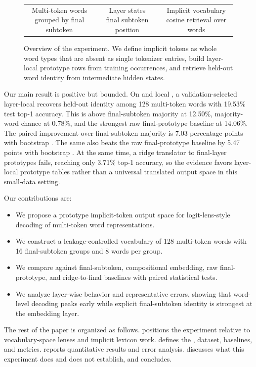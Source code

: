 \begin{figure}[t]
    \centering
    \setlength{\tabcolsep}{4pt}
    \begin{tabular}{@{}c@{\quad$\rightarrow$\quad}c@{\quad$\rightarrow$\quad}c@{}}
        \fbox{\parbox{0.25\linewidth}{\centering Multi-token words\\{\small grouped by final subtoken}}} &
        \fbox{\parbox{0.25\linewidth}{\centering Layer states\\{\small final subtoken position}}} &
        \fbox{\parbox{0.25\linewidth}{\centering Implicit vocabulary\\{\small cosine retrieval over words}}}
    \end{tabular}
    \caption{Overview of the \itl experiment. We define implicit tokens as whole word types that are absent as single tokenizer entries, build layer-local prototype rows from training occurrences, and retrieve held-out word identity from intermediate hidden states.}
    \label{fig:method}
\end{figure}

Our main result is positive but bounded. On \qwen and local \wikitext, a validation-selected layer-local \itl recovers held-out identity among 128 multi-token words with 19.53\% test top-1 accuracy. This is above final-subtoken majority at 12.50\%, majority-word chance at 0.78\%, and the strongest raw final-prototype baseline at 14.06\%. The paired improvement over final-subtoken majority is 7.03 percentage points with bootstrap \ci [2.53, 11.72]. The same \itl also beats the raw final-prototype baseline by 5.47 points with bootstrap \ci [2.15, 8.79]. At the same time, a ridge translator to final-layer prototypes fails, reaching only 3.71\% top-1 accuracy, so the evidence favors layer-local prototype tables rather than a universal translated output space in this small-data setting.

Our contributions are:
\begin{itemize}[leftmargin=*,itemsep=0pt,topsep=0pt]
    \item We propose a prototype implicit-token output space for logit-lens-style decoding of multi-token word representations.
    \item We construct a leakage-controlled vocabulary of 128 multi-token words with 16 final-subtoken groups and 8 words per group.
    \item We compare \itl against final-subtoken, compositional embedding, raw final-prototype, and ridge-to-final baselines with paired statistical tests.
    \item We analyze layer-wise behavior and representative errors, showing that word-level decoding peaks early while explicit final-subtoken identity is strongest at the embedding layer.
\end{itemize}

The rest of the paper is organized as follows.  positions the experiment relative to vocabulary-space lenses and implicit lexicon work.  defines the \itl, dataset, baselines, and metrics.  reports quantitative results and error analysis.  discusses what this experiment does and does not establish, and  concludes.
